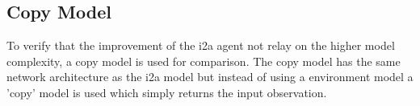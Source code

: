 \subsection{Copy Model}

To verify that the improvement of the i2a agent not relay on the higher model complexity, a copy model is used for comparison. The copy model has the same network architecture as the i2a model but instead of using a environment model a 'copy' model is used which simply returns the input observation. 